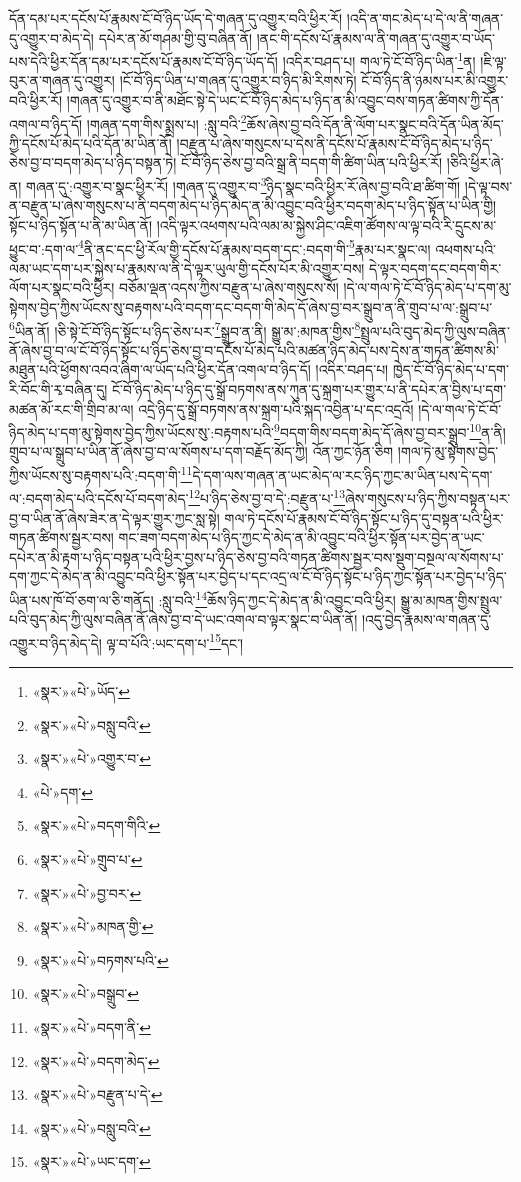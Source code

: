 དོན་དམ་པར་དངོས་པོ་རྣམས་ངོ་བོ་ཉིད་ཡོད་དེ་གཞན་དུ་འགྱུར་བའི་ཕྱིར་རོ། །འདི་ན་གང་མེད་པ་དེ་ལ་ནི་གཞན་དུ་འགྱུར་བ་མེད་དེ། དཔེར་ན་མོ་གཤམ་གྱི་བུ་བཞིན་ནོ། །ནང་གི་དངོས་པོ་རྣམས་ལ་ནི་གཞན་དུ་འགྱུར་བ་ཡོད་པས་དེའི་ཕྱིར་དོན་དམ་པར་དངོས་པོ་རྣམས་ངོ་བོ་ཉིད་ཡོད་དོ། །འདིར་བཤད་པ། གལ་ཏེ་ངོ་བོ་ཉིད་ཡིན་\footnote{«སྣར་»«པེ་»ཡོད་}ན། །ཇི་ལྟ་བུར་ན་གཞན་དུ་འགྱུར། །ངོ་བོ་ཉིད་ཡིན་པ་གཞན་དུ་འགྱུར་བ་ཉིད་མི་རིགས་ཏེ། ངོ་བོ་ཉིད་ནི་ཉམས་པར་མི་འགྱུར་བའི་ཕྱིར་རོ། །གཞན་དུ་འགྱུར་བ་ནི་མཐོང་སྟེ་དེ་ཡང་ངོ་བོ་ཉིད་མེད་པ་ཉིད་ན་མི་འབྱུང་བས་གཏན་ཚིགས་ཀྱི་དོན་འགལ་བ་ཉིད་དོ། །གཞན་དག་གིས་སྨྲས་པ། :སླུ་བའི་\footnote{«སྣར་»«པེ་»བསླུ་བའི་}ཆོས་ཞེས་བྱ་བའི་དོན་ནི་ལོག་པར་སྣང་བའི་དོན་ཡིན་མོད་ཀྱི་དངོས་པོ་མེད་པའི་དོན་མ་ཡིན་ནོ། །བརྫུན་པ་ཞེས་གསུངས་པ་དེས་ནི་དངོས་པོ་རྣམས་ངོ་བོ་ཉིད་མེད་པ་ཉིད་ཅེས་བྱ་བ་བདག་མེད་པ་ཉིད་བསྟན་ཏེ། ངོ་བོ་ཉིད་ཅེས་བྱ་བའི་སྒྲ་ནི་བདག་གི་ཚིག་ཡིན་པའི་ཕྱིར་རོ། །ཅིའི་ཕྱིར་ཞེ་ན། གཞན་དུ་:འགྱུར་བ་སྣང་ཕྱིར་རོ། །གཞན་དུ་འགྱུར་བ་\footnote{«སྣར་»«པེ་»འགྱུར་བ་}ཉིད་སྣང་བའི་ཕྱིར་རོ་ཞེས་བྱ་བའི་ཐ་ཚིག་གོ། །དེ་ལྟ་བས་ན་བརྫུན་པ་ཞེས་གསུངས་པ་ནི་བདག་མེད་པ་ཉིད་མེད་ན་མི་འབྱུང་བའི་ཕྱིར་བདག་མེད་པ་ཉིད་སྟོན་པ་ཡིན་གྱི། སྟོང་པ་ཉིད་སྟོན་པ་ནི་མ་ཡིན་ནོ། །འདི་ལྟར་འཕགས་པའི་ལམ་མ་སྐྱེས་ཤིང་འཇིག་ཚོགས་ལ་ལྟ་བའི་རི་དྲུངས་མ་ཕྱུང་བ་:དག་ལ་\footnote{«པེ་»དག་}ནི་ནང་དང་ཕྱི་རོལ་གྱི་དངོས་པོ་རྣམས་བདག་དང་:བདག་གི་\footnote{«སྣར་»«པེ་»བདག་གིའི་}རྣམ་པར་སྣང་ལ། འཕགས་པའི་ལམ་ཡང་དག་པར་སྐྱེས་པ་རྣམས་ལ་ནི་དེ་ལྟར་ཡུལ་གྱི་དངོས་པོར་མི་འགྱུར་བས། དེ་ལྟར་བདག་དང་བདག་གིར་ལོག་པར་སྣང་བའི་ཕྱིར། བཅོམ་ལྡན་འདས་ཀྱིས་བརྫུན་པ་ཞེས་གསུངས་སོ། །དེ་ལ་གལ་ཏེ་ངོ་བོ་ཉིད་མེད་པ་དག་མུ་སྟེགས་བྱེད་ཀྱིས་ཡོངས་སུ་བརྟགས་པའི་བདག་དང་བདག་གི་མེད་དོ་ཞེས་བྱ་བར་སྒྲུབ་ན་ནི་གྲུབ་པ་ལ་:སྒྲུབ་པ་\footnote{«སྣར་»«པེ་»གྲུབ་པ་}ཡིན་ནོ། །ཅི་སྟེ་ངོ་བོ་ཉིད་སྟོང་པ་ཉིད་ཅེས་པར་\footnote{«སྣར་»«པེ་»བྱ་བར་}སྒྲུབ་ན་ནི། སྒྱུ་མ་:མཁན་གྱིས་\footnote{«སྣར་»«པེ་»མཁན་གྱི་}སྤྲུལ་པའི་བུད་མེད་ཀྱི་ལུས་བཞིན་ནོ་ཞེས་བྱ་བ་ལ་ངོ་བོ་ཉིད་སྟོང་པ་ཉིད་ཅེས་བྱ་བ་དངོས་པོ་མེད་པའི་མཚན་ཉིད་མེད་པས་དེས་ན་གཏན་ཚིགས་མི་མཐུན་པའི་ཕྱོགས་འབའ་ཞིག་ལ་ཡོད་པའི་ཕྱིར་དོན་འགལ་བ་ཉིད་དོ། །འདིར་བཤད་པ། ཁྱེད་ངོ་བོ་ཉིད་མེད་པ་དག་རི་བོང་གི་རྭ་བཞིན་དུ། ངོ་བོ་ཉིད་མེད་པ་ཉིད་དུ་སྒྲོ་བཏགས་ནས་ཀུན་དུ་སྐྲག་པར་གྱུར་པ་ནི་དཔེར་ན་བྱིས་པ་དག་མཚན་མོ་རང་གི་གྲིབ་མ་ལ། འདྲེ་ཉིད་དུ་སྒྲོ་བཏགས་ནས་སྐྲག་པའི་སྐད་འབྱིན་པ་དང་འདྲའོ། །དེ་ལ་གལ་ཏེ་ངོ་བོ་ཉིད་མེད་པ་དག་མུ་སྟེགས་བྱེད་ཀྱིས་ཡོངས་སུ་:བརྟགས་པའི་\footnote{«སྣར་»«པེ་»བཏགས་པའི་}བདག་གིས་བདག་མེད་དོ་ཞེས་བྱ་བར་སྒྲུབ་\footnote{«སྣར་»«པེ་»བསྒྲུབ་}ན་ནི། གྲུབ་པ་ལ་སྒྲུབ་པ་ཡིན་ནོ་ཞེས་བྱ་བ་ལ་སོགས་པ་དག་བརྗོད་མོད་ཀྱི། འོན་ཀྱང་ཉོན་ཅིག །གལ་ཏེ་མུ་སྟེགས་བྱེད་ཀྱིས་ཡོངས་སུ་བརྟགས་པའི་:བདག་གི་\footnote{«སྣར་»«པེ་»བདག་ནི་}དེ་དག་ལས་གཞན་ན་ཡང་མེད་ལ་རང་ཉིད་ཀྱང་མ་ཡིན་པས་དེ་དག་ལ་:བདག་མེད་པའི་དངོས་པོ་བདག་མེད་\footnote{«སྣར་»«པེ་»བདག་མེད་}པ་ཉིད་ཅེས་བྱ་བ་དེ་:བརྫུན་པ་\footnote{«སྣར་»«པེ་»བརྫུན་པ་དེ་}ཞེས་གསུངས་པ་ཉིད་ཀྱིས་བསྟན་པར་བྱ་བ་ཡིན་ནོ་ཞེས་ཟེར་ན་དེ་ལྟར་གྱུར་ཀྱང་སླ་སྟེ། གལ་ཏེ་དངོས་པོ་རྣམས་ངོ་བོ་ཉིད་སྟོང་པ་ཉིད་དུ་བསྟན་པའི་ཕྱིར་གཏན་ཚིགས་སྦྱར་བས། གང་ཟག་བདག་མེད་པ་ཉིད་ཀྱང་དེ་མེད་ན་མི་འབྱུང་བའི་ཕྱིར་སྟོན་པར་བྱེད་ན་ཡང་དཔེར་ན་མི་རྟག་པ་ཉིད་བསྟན་པའི་ཕྱིར་བྱས་པ་ཉིད་ཅེས་བྱ་བའི་གཏན་ཚིགས་སྦྱར་བས་སྡུག་བསྔལ་ལ་སོགས་པ་དག་ཀྱང་དེ་མེད་ན་མི་འབྱུང་བའི་ཕྱིར་སྟོན་པར་བྱེད་པ་དང་འདྲ་ལ་ངོ་བོ་ཉིད་སྟོང་པ་ཉིད་ཀྱང་སྟོན་པར་བྱེད་པ་ཉིད་ཡིན་པས་ཁོ་བོ་ཅག་ལ་ཅི་གནོད། :སླུ་བའི་\footnote{«སྣར་»«པེ་»བསླུ་བའི་}ཆོས་ཉིད་ཀྱང་དེ་མེད་ན་མི་འབྱུང་བའི་ཕྱིར། སྒྱུ་མ་མཁན་གྱིས་སྤྲུལ་པའི་བུད་མེད་ཀྱི་ལུས་བཞིན་ནོ་ཞེས་བྱ་བ་དེ་ཡང་འགལ་བ་ལྟར་སྣང་བ་ཡིན་ནོ། །འདུ་བྱེད་རྣམས་ལ་གཞན་དུ་འགྱུར་བ་ཉིད་མེད་དེ། ལྟ་བ་པོའི་:ཡང་དག་པ་\footnote{«སྣར་»«པེ་»ཡང་དག་}དང་། 